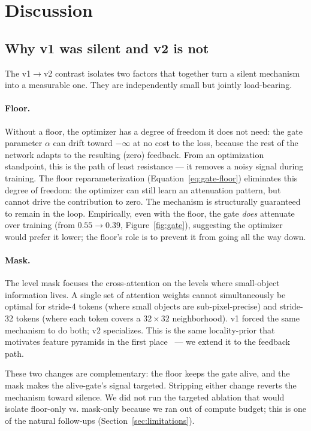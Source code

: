 \section{Discussion}
\label{sec:discussion}

\subsection{Why v1 was silent and v2 is not}

The v1$\to$v2 contrast isolates two factors that together turn a silent mechanism into a measurable one. They are independently small but jointly load-bearing.

\paragraph{Floor.} Without a floor, the optimizer has a degree of freedom it does not need: the gate parameter $\alpha$ can drift toward $-\infty$ at no cost to the loss, because the rest of the network adapts to the resulting (zero) feedback. From an optimization standpoint, this is the path of least resistance --- it removes a noisy signal during training. The floor reparameterization (Equation~\ref{eq:gate-floor}) eliminates this degree of freedom: the optimizer can still learn an attenuation pattern, but cannot drive the contribution to zero. The mechanism is structurally guaranteed to remain in the loop. Empirically, even with the floor, the gate \emph{does} attenuate over training (from $0.55 \to 0.39$, Figure~\ref{fig:gate}), suggesting the optimizer would prefer it lower; the floor's role is to prevent it from going all the way down.

\paragraph{Mask.} The level mask focuses the cross-attention on the levels where small-object information lives. A single set of attention weights cannot simultaneously be optimal for stride-4 tokens (where small objects are sub-pixel-precise) and stride-32 tokens (where each token covers a $32\!\times\!32$ neighborhood). v1 forced the same mechanism to do both; v2 specializes. This is the same locality-prior that motivates feature pyramids in the first place~\cite{lin2017fpn} --- we extend it to the feedback path.

These two changes are complementary: the floor keeps the gate alive, and the mask makes the alive-gate's signal targeted. Stripping either change reverts the mechanism toward silence. We did not run the targeted ablation that would isolate floor-only vs. mask-only because we ran out of compute budget; this is one of the natural follow-ups (Section~\ref{sec:limitations}).

